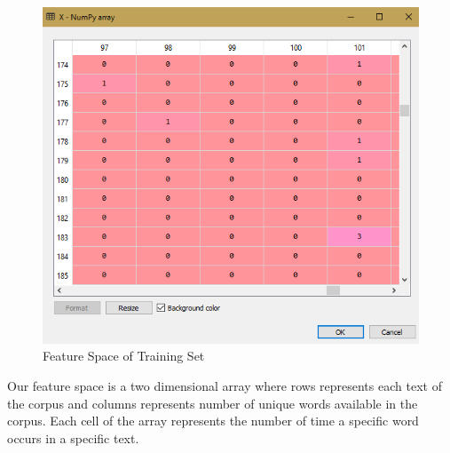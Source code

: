 \documentclass[12pt,a4paper]{report}
\begin{document}
\par\noindent
\begin{figure}[h!]
    \centering
    \includegraphics[scale=0.9]{Figures/feature.PNG}
    \caption{Feature Space of Training Set}
    \label{fig:feature}
\end{figure}
\par\noindent
Our feature space is a two dimensional array where rows represents each text of the corpus and columns represents number of unique words available in the corpus. Each cell of the array represents the number of time a specific word occurs in a specific text. 
\end{document}
